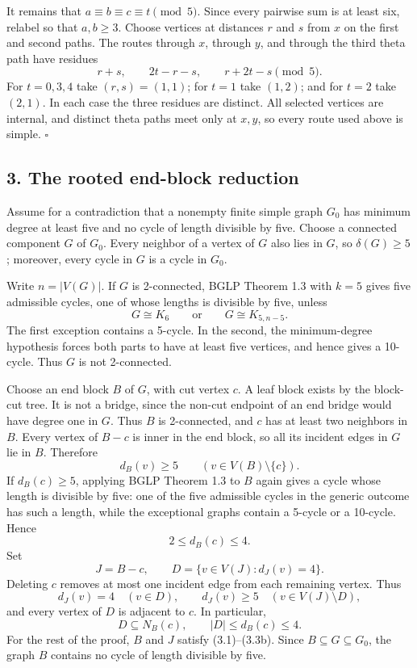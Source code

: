 \documentclass[
  11pt]{article}
\let\papersection\subsection
\renewcommand{\subsection}{\Needspace{10\baselineskip}\papersection}
\begin{document}
It remains that \(a\equiv b\equiv c\equiv t\pmod5\). Since every
pairwise sum is at least six, relabel so that \(a,b\ge3\). Choose
vertices at distances \(r\) and \(s\) from \(x\) on the first and second
paths. The routes through \(x\), through \(y\), and through the third
theta path have residues \[
 r+s,\qquad 2t-r-s,\qquad r+2t-s \pmod5.
\] For \(t=0,3,4\) take \((r,s)=(1,1)\); for \(t=1\) take \((1,2)\); and
for \(t=2\) take \((2,1)\). In each case the three residues are
distinct. All selected vertices are internal, and distinct theta paths
meet only at \(x,y\), so every route used above is simple. \(\square\)

\subsection{3. The rooted end-block
reduction}\label{the-rooted-end-block-reduction}

Assume for a contradiction that a nonempty finite simple graph \(G_0\)
has minimum degree at least five and no cycle of length divisible by
five. Choose a connected component \(G\) of \(G_0\). Every neighbor of a
vertex of \(G\) also lies in \(G\), so \(\delta(G)\ge5\); moreover,
every cycle in \(G\) is a cycle in \(G_0\).

Write \(n=|V(G)|\). If \(G\) is 2-connected, BGLP Theorem 1.3 with
\(k=5\) gives five admissible cycles, one of whose lengths is divisible
by five, unless \[
 G\cong K_6
 \qquad\text{or}\qquad
 G\cong K_{5,n-5}.
\] The first exception contains a 5-cycle. In the second, the
minimum-degree hypothesis forces both parts to have at least five
vertices, and hence gives a 10-cycle. Thus \(G\) is not 2-connected.

Choose an end block \(B\) of \(G\), with cut vertex \(c\). A leaf block
exists by the block-cut tree. It is not a bridge, since the non-cut
endpoint of an end bridge would have degree one in \(G\). Thus \(B\) is
2-connected, and \(c\) has at least two neighbors in \(B\). Every vertex
of \(B-c\) is inner in the end block, so all its incident edges in \(G\)
lie in \(B\). Therefore \[
 d_B(v)\ge5\qquad(v\in V(B)\setminus\{c\}). \tag{3.1}
\] If \(d_B(c)\ge5\), applying BGLP Theorem 1.3 to \(B\) again gives a
cycle whose length is divisible by five: one of the five admissible
cycles in the generic outcome has such a length, while the exceptional
graphs contain a 5-cycle or a 10-cycle. Hence \[
 2\le d_B(c)\le4. \tag{3.2}
\] Set \[
 J=B-c,
 \qquad
 D=\{v\in V(J):d_J(v)=4\}.
\] Deleting \(c\) removes at most one incident edge from each remaining
vertex. Thus \[
 d_J(v)=4\quad(v\in D),
 \qquad
 d_J(v)\ge5\quad(v\in V(J)\setminus D),
 \tag{3.3a}
\] and every vertex of \(D\) is adjacent to \(c\). In particular, \[
 D\subseteq N_B(c),
 \qquad
 |D|\le d_B(c)\le4. \tag{3.3b}
\] For the rest of the proof, \(B\) and \(J\) satisfy (3.1)--(3.3b).
Since \(B\subseteq G\subseteq G_0\), the graph \(B\) contains no cycle
of length divisible by five.
\end{document}
